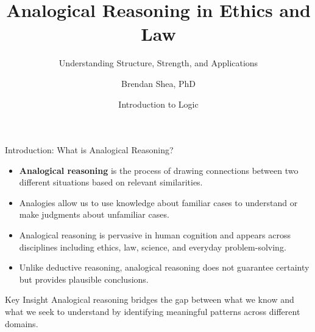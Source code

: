 \documentclass{beamer}
\title{Analogical Reasoning in Ethics and Law}
\subtitle{Understanding Structure, Strength, and Applications}
\author{Brendan Shea, PhD}
\date{Introduction to Logic}
\begin{document}
	
	\begin{frame}
		\titlepage
	\end{frame}
	
	\begin{frame}{Introduction: What is Analogical Reasoning?}
		\begin{itemize}
			\item \textbf{Analogical reasoning} is the process of drawing connections between two different situations based on relevant similarities.
			\item Analogies allow us to use knowledge about familiar cases to understand or make judgments about unfamiliar cases.
			\item Analogical reasoning is pervasive in human cognition and appears across disciplines including ethics, law, science, and everyday problem-solving.
			\item Unlike deductive reasoning, analogical reasoning does not guarantee certainty but provides plausible conclusions.
		\end{itemize}
		
		\begin{alertblock}{Key Insight}
			Analogical reasoning bridges the gap between what we know and what we seek to understand by identifying meaningful patterns across different domains.
		\end{alertblock}
	\end{frame}
	
\end{document}
